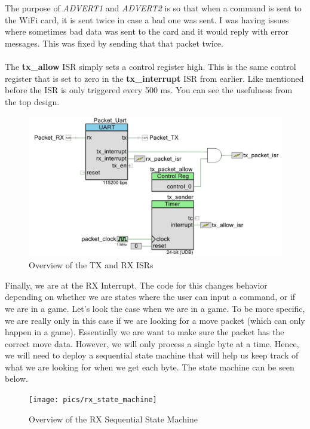 \documentclass[a4paper, 12pt]{article}
\begin{document}
    The purpose of \textit{ADVERT1} and \textit{ADVERT2} is so that when a
    command is sent to the WiFi card, it is sent twice in case a bad one was
    sent. I was having issues where sometimes bad data was sent to the card
    and it would reply with error messages. This was fixed by sending that
    that packet twice.
    \\ \\

    The \textbf{tx\_allow} ISR simply sets a control register high. This is
    the same control register that is set to zero in the \textbf{tx\_interrupt}
    ISR from earlier. Like mentioned before the ISR is only triggered every
    500 ms. You can see the usefulness from the top design.

    \begin{figure}[H]
        \centering
        \includegraphics[scale=0.5]{pics/packet_com}
        \caption{Overview of the TX and RX ISRs}
        \label{fig:TXRXSetup}
    \end{figure}

    Finally, we are at the RX Interrupt. The code for this changes behavior
    depending on whether we are states where the user can input a command, or
    if we are in a game. Let's look the case when we are in a game. To be more
    specific, we are really only in this case if we are looking for a move packet
    (which can only happen in a game). Essentially we are want to make
    sure the packet has the correct move data. However, we will only
    process a single byte at a time. Hence, we will need to deploy a
    sequential state machine that will help us keep track of what we are looking
    for when we get each byte. The state machine can be seen below.

    \begin{figure}[H]
        \centering
        \texttt{[image: pics/rx\_state\_machine]}
        \caption{Overview of the RX Sequential State Machine}
        \label{fig:TXRXSetup}
    \end{figure}
\end{document}
